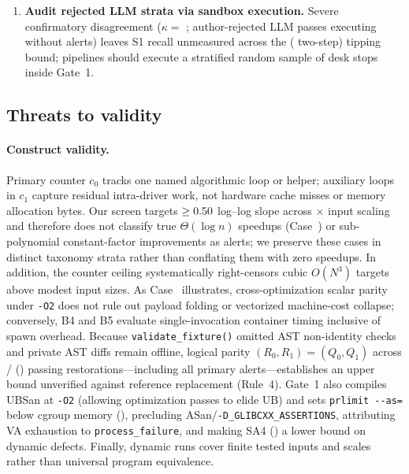 \documentclass[11pt]{article}
\newcommand{\CaseRef}[1]{Case~#1}
\begin{document}
\begin{enumerate}
\item \textbf{Audit rejected LLM strata via sandbox execution.} Severe confirmatory disagreement ($\kappa =$ \BenchAuthConfBinK{}; \BenchAuthRejExec{} author-rejected LLM passes executing without alerts) leaves S1 recall unmeasured across the \BenchManskiTipRate{} (\BenchManskiTwoStepTipTheta{} two-step) tipping bound; pipelines should execute a stratified random sample of desk stops inside Gate~1.
\end{enumerate}

\subsection{Threats to validity}

\paragraph{Construct validity.}
Primary counter $c_0$ tracks one named algorithmic loop or helper; auxiliary loops in $c_1$ capture residual intra-driver work, not hardware cache misses or memory allocation bytes.
Our screen targets $\ge 0.50{}$ log--log slope across \BenchMinSpan{}$\times$ input scaling and therefore does not classify true $\Theta(\log n)$ speedups (\CaseRef{\BenchPosSevenSeven{}}) or sub-polynomial constant-factor improvements as alerts; we preserve these cases in distinct taxonomy strata rather than conflating them with zero speedups.
In addition, the \BenchTickCeiling{} counter ceiling systematically right-censors cubic $O(N^3)$ targets above modest input sizes.
As \CaseRef{\BenchPosNineFour{}} illustrates, cross-optimization scalar parity under \texttt{-O2} does not rule out payload folding or vectorized machine-cost collapse; conversely, B4 and B5 evaluate single-invocation container timing inclusive of \BenchBwrapOverheadMs{} spawn overhead.
Because \texttt{validate\_fixture()} omitted AST non-identity checks and private AST diffs remain offline, logical parity $(R_0, R_1) = (Q_0, Q_1)$ across \BenchRestExactCopyN{}/\BenchRestFitPassN{} (\BenchRestExactCopyPct{}) passing restorations---including all \BenchPThreeCount{} primary alerts---establishes an upper bound unverified against reference replacement (Rule~4).
Gate~1 also compiles UBSan at \texttt{-O2} (allowing optimization passes to elide UB) and sets \texttt{prlimit -{}-as=\BenchAsCapMiB{}} below cgroup memory (\BenchMemCapMiB{}), precluding ASan/\texttt{-D\_GLIBCXX\_ASSERTIONS}, attributing VA exhaustion to \texttt{process\_failure}, and making SA4 (\BenchOracleFailPct{}) a lower bound on dynamic defects.
Finally, dynamic runs cover finite tested inputs and scales rather than universal program equivalence.
\end{document}
